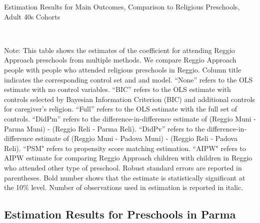\begin{table}[H] \caption{Estimation Results for Main Outcomes, Comparison to Religious Preschools, Adult 40s Cohorts} \label{ols-M-adult40-reg-reli}
\scalebox{0.75}{}
\vspace{1ex} \\
\footnotesize\raggedright{Note: This table shows the estimates of the coefficient for attending Reggio Approach preschools from multiple methods. We compare Reggio Approach people with people who attended religious preschools in Reggio. Column title indicates the corresponding control set and and model. ``None'' refers to the OLS estimate with no control variables. ``BIC'' refers to the OLS estimate with controls selected by Bayesian Information Criterion (BIC) and additional controls for caregiver's religion. ``Full'' refers to the OLS estimate with the full set of controls. ``DidPm'' refers to the difference-in-difference estimate of (Reggio Muni - Parma Muni) - (Reggio Reli - Parma Reli). ``DidPv'' refers to the difference-in-difference estimate of (Reggio Muni - Padova Muni) - (Reggio Reli - Padova Reli). ``PSM" refers to propensity score matching estimation. ``AIPW" refers to AIPW estimate for comparing Reggio Approach children with children in Reggio who attended other type of preschool. Robust standard errors are reported in parentheses. Bold number shows that the estimate is statistically significant at the 10\% level. Number of observations used in estimation is reported in italic.}
\end{table}








\subsection{Estimation Results for Preschools in Parma}




